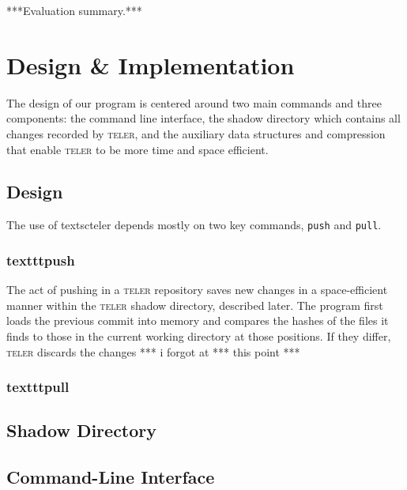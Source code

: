 \documentclass[12pt, letterpaper]{article}
\begin{document}
***Evaluation summary.***

\section{Design \& Implementation}
\label{sec:desimp}
The design of our program is centered around two main commands and three
components: the command line interface, the shadow directory which contains all
changes recorded by \textsc{teler}, and the auxiliary data structures and
compression that enable \textsc{teler} to be more time and space efficient.

\subsection{Design}
\label{subsec:design}
The use of textsc{teler} depends mostly on two key commands, \texttt{push} and
\texttt{pull}.

\subsubsection{texttt{push}}
\label{subsubsec:push}
The act of pushing in a \textsc{teler} repository saves new changes in a
space-efficient manner within the \textsc{teler} shadow directory, described
later. The program first loads the previous commit into memory and compares the
hashes of the files it finds to those in the current working directory at those
positions. If they differ, \textsc{teler} discards the changes *** i forgot at
*** this point ***

\subsubsection{texttt{pull}}
\label{subsubsec:pull}

\subsection{Shadow Directory}
\label{subsec:shadowdir}

\subsection{Command-Line Interface}
\label{subsec:cli}
\end{document}
